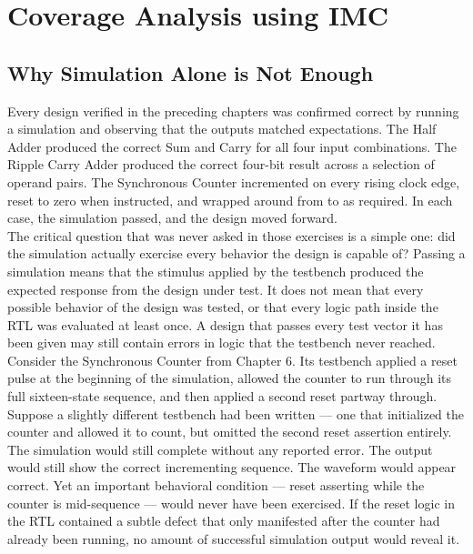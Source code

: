 \chapter{Coverage Analysis using IMC}

\section{Why Simulation Alone is Not Enough}
\label{sec:sim-not-enough}

Every design verified in the preceding chapters was confirmed correct by running a simulation and observing that the outputs matched expectations. The Half Adder produced the correct Sum and Carry for all four input combinations. The Ripple Carry Adder produced the correct four-bit result across a selection of operand pairs. The Synchronous Counter incremented on every rising clock edge, reset to zero when instructed, and wrapped around from  to  as required. In each case, the simulation passed, and the design moved forward.\\

The critical question that was never asked in those exercises is a simple one: did the simulation actually exercise every behavior the design is capable of? Passing a simulation means that the stimulus applied by the testbench produced the expected response from the design under test. It does not mean that every possible behavior of the design was tested, or that every logic path inside the RTL was evaluated at least once. A design that passes every test vector it has been given may still contain errors in logic that the testbench never reached.\\

Consider the Synchronous Counter from Chapter 6. Its testbench applied a reset pulse at the beginning of the simulation, allowed the counter to run through its full sixteen-state sequence, and then applied a second reset partway through. Suppose a slightly different testbench had been written — one that initialized the counter and allowed it to count, but omitted the second reset assertion entirely. The simulation would still complete without any reported error. The  output would still show the correct incrementing sequence. The waveform would appear correct. Yet an important behavioral condition — reset asserting while the counter is mid-sequence — would never have been exercised. If the reset logic in the RTL contained a subtle defect that only manifested after the counter had already been running, no amount of successful simulation output would reveal it.\\

